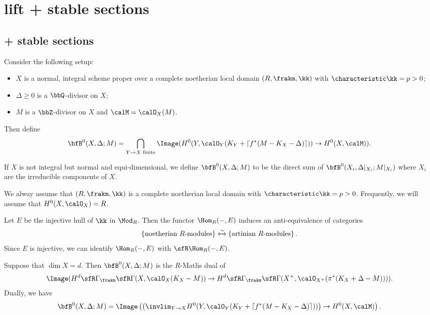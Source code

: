 \section{lift + stable sections}


\subsection{+ stable sections}

    \begin{definition}\label{def:plus_stable_section}
        Consider the following setup:
        \begin{itemize}
            \item $X$ is a normal, integral scheme proper over a complete noetherian local domain \((R,\frakm,\kk)\) with \(\characteristic \kk = p>0\);
            \item \(\Delta\geq 0\) is a \(\bbQ\)-divisor on \(X\);
            \item \(M\) is a \(\bbZ\)-divisor on \(X\) and \(\calM = \calO_X(M)\).
        \end{itemize}
        Then define 
        \[ \bfB^0(X,\Delta;M) = \bigcap_{Y \to X \text{ finite}} \Image(H^0(Y,\calO_Y(K_Y + \lceil f^*(M-K_X-\Delta)\rceil)) \to H^0(X,\calM)).\]
    \end{definition}

    If \(X\) is not integral but normal and equi-dimensional, we define \(\bfB^0(X,\Delta;M)\) to be the direct sum of \(\bfB^0(X_i,\Delta|_{X_i};M|_{X_i})\) where \(X_i\) are the irreducible components of \(X\).

    We alway assume that \((R,\frakm, \kk)\) is a complete noetherian local domain with \(\characteristic \kk = p>0\).
    Frequently, we will assume that \(H^0(X,\calO_X) = R\).

    \begin{theorem}\label{thm:matlis_dual}
        Let \(E\) be the injective hull of \(\kk\) in \(\Mod_R\).
        Then the functor \(\Hom_R(-,E)\) induces an anti-equivalence of categories
        \[ \left\{ \text{noetherian } R\text{-modules} \right\} \xleftrightarrow{\sim} \left\{ \text{artinian } R\text{-modules} \right\}.\]
        Since \(E\) is injective, we can identify \(\Hom_R(-,E)\) with \(\sfR\Hom_R(-,E)\).
    \end{theorem}

    \begin{proposition}\label{prop:matlis_dual_b0}
        Suppose that \(\dim X = d\). 
        Then \(\bfB^0(X,\Delta;M)\) is the \(R\)-Matlis dual of 
        \[ \Image(H^d\sfR\Gamma_\frakm\sfR\Gamma(X,\calO_X(K_X - M)) \to H^d\sfR\Gamma_\frakm\sfR\Gamma(X^+,\calO_{X^+}(\pi^*(K_X+\Delta-M)))).\]
        Dually, we have
        \[ \bfB^0(X,\Delta;M) = \Image\left(\left(\invlim_{Y \to X} H^0(Y,\calO_Y(K_Y+\lceil f^*(M-K_X-\Delta)\rceil))\right) \to H^0(X,\calM)\right).\]
    \end{proposition}

